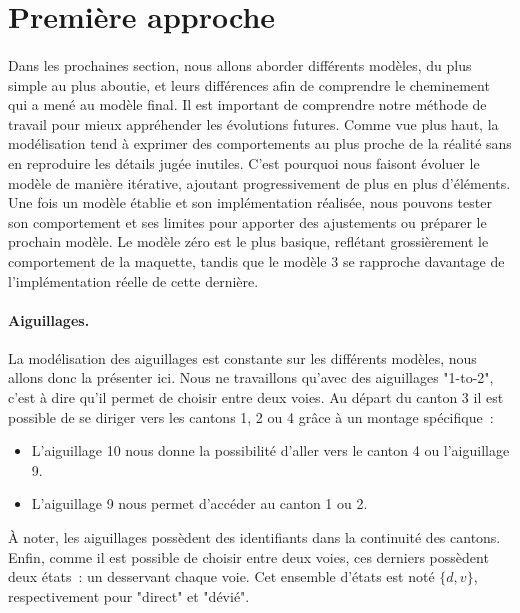 \documentclass[oneside, a4paper, 11pt]{book}
\begin{document}


\section{Première approche}

\paragraph{} 
Dans les prochaines section, nous allons aborder différents modèles, du plus simple au plus aboutie, et leurs différences afin de comprendre le cheminement qui a mené au modèle final. Il est important de comprendre notre méthode de travail pour mieux appréhender les évolutions futures.
Comme vue plus haut, la modélisation tend à exprimer des comportements au plus proche de la réalité sans en reproduire les détails jugée inutiles.
C'est pourquoi nous faisont évoluer le modèle de manière itérative, ajoutant progressivement de plus en plus d'éléments.
Une fois un modèle établie et son implémentation réalisée, nous pouvons tester son comportement et ses limites pour apporter des ajustements ou préparer le prochain modèle.
Le modèle zéro est le plus basique, reflétant grossièrement le comportement de la maquette, tandis que le modèle 3 se rapproche davantage de l'implémentation réelle de cette dernière.

\paragraph{Aiguillages.}
La modélisation des aiguillages est constante sur les différents modèles, nous allons donc la présenter ici. Nous ne travaillons qu'avec des aiguillages "1-to-2", c'est à dire qu'il permet de choisir entre deux voies.
Au départ du canton 3 il est possible de se diriger vers les cantons 1, 2 ou 4 grâce à un montage spécifique~: 
\begin{itemize}
	\item L'aiguillage 10 nous donne la possibilité d'aller vers le canton 4 ou l'aiguillage 9.
	\item L'aiguillage 9 nous permet d'accéder au canton 1 ou 2.
\end{itemize}
À noter, les aiguillages possèdent des identifiants dans la continuité des cantons.
Enfin, comme il est possible de choisir entre deux voies, ces derniers possèdent deux états~: un desservant chaque voie. Cet ensemble d'états est noté $\{d,v\}$, respectivement pour "direct" et "dévié". 
\end{document}
